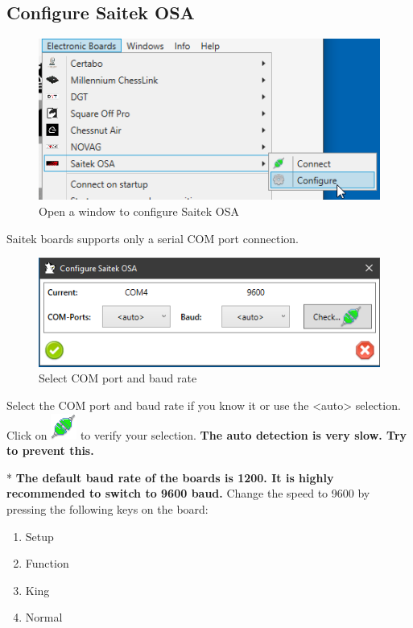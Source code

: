 \documentclass[11pt,a4paper]{article}
\begin{document}
\subsection{Configure Saitek OSA} \label{ConfigureSaitekOSA}

\begin{figure}[H]
	\centering
	\includegraphics[scale=1.0]{Saitek1.png}
	\caption{Open a window to configure Saitek OSA }
	\label{fig:Saitek1}
\end{figure}

Saitek boards supports only a serial COM port connection.

\begin{figure}[H]
	\centering
	\includegraphics[scale=0.9]{Saitek2.png}
	\caption{Select COM port and baud rate}
	\label{fig:Saitek2}
\end{figure}

Select the COM port and baud rate if you know it or use the <auto> selection. 
Click on \includegraphics[scale=0.5]{connect.png} to verify your selection. \textbf{The auto detection is very slow. Try to prevent this.}

{\color{red}*} \textbf{The default baud rate of the boards is 1200. It is highly recommended to switch to 9600 baud.} Change the speed to 9600 by pressing the following keys on the board:

\begin{enumerate}
	\item {\color{blue}Setup}
 	\item {\color{blue}Function}
	\item {\color{blue}King}
	\item {\color{blue}Normal}
\end{enumerate}
\end{document}
